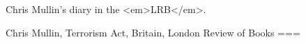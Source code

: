 Chris Mullin’s diary in the <em>LRB</em>.

Chris Mullin, Terrorism Act, Britain, London Review of Books
===
\nocite{mullin2022}